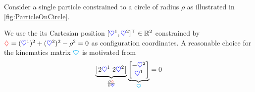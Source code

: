 % 

\begin{Example}
Consider a single particle constrained to a circle of radius $\rho$ as illustrated in \autoref{fig:ParticleOnCircle}.

\begin{minipage}{\textwidth}
 \centering
 
 \label{fig:ParticleOnCircle}
\end{minipage}

We use the its Cartesian position $[\sysCoordCoeff{1}, \sysCoordCoeff{2}]^\top \in \RealNum^2$ constrained by $\geoConstraintCoeff{} = (\sysCoordCoeff{1})^2 + (\sysCoordCoeff{2})^2 - \rho^2 = 0$ as configuration coordinates.
A reasonable choice for the kinematics matrix $\kinMat$ is motivated from
\begin{align}
 \underbrace{\big[ 2\sysCoordCoeff{1} \ 2\sysCoordCoeff{2} \big]}_{\pdiff[\geoConstraintCoeff{}]{\sysCoord}}
 \underbrace{\begin{bmatrix} -\sysCoordCoeff{2} \\ \sysCoordCoeff{1} \end{bmatrix}}_{\kinMat}
 = 0
\end{align}
\end{Example}

